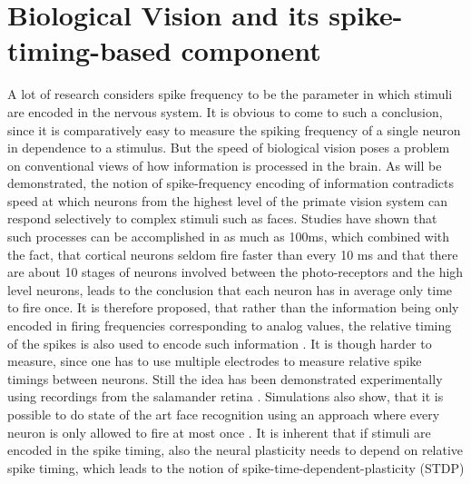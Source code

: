 \documentclass{SeminarV2}
\begin{document}
\section{Biological Vision and its spike-timing-based component} 
A lot of research considers spike frequency to be the parameter in which stimuli are encoded in the nervous system. It is obvious to come to such a conclusion, since it is comparatively easy to measure the spiking frequency of a single neuron in dependence to a stimulus.
But the speed of biological vision poses a problem on conventional views of how information is processed in the brain.
As will be demonstrated, the notion of spike-frequency encoding of information contradicts speed at which neurons from the highest level of the primate vision system can respond selectively to complex stimuli such as faces.
Studies have shown that such processes can be accomplished in as much as 100ms, which combined with the fact, that cortical neurons seldom fire faster than every 10 ms and that there are about 10 stages of neurons involved between the photo-receptors and the high level neurons, leads to the conclusion that each neuron has in average only time to fire once.
It is therefore proposed, that rather than the information being only encoded in firing frequencies corresponding to analog values,
the relative timing of the spikes is also used to encode such information \cite{thorpe_biological_1989} \cite{bialek_reading_1991} \cite{gerstner_why_1993}. It is though harder to measure, since one has to use multiple electrodes to measure relative spike timings between neurons.
Still  the idea has been demonstrated experimentally using recordings from the salamander retina \cite{gollisch_rapid_2008}.
Simulations also show, that it is possible to do state of the art face recognition using an approach 
where every neuron is only allowed to fire at most once \cite{thorpe_spike-based_2012}.
It is inherent that if stimuli are encoded in the spike timing, also the neural plasticity needs to depend on relative spike timing, which leads to the notion of spike-time-dependent-plasticity (STDP)
\end{document}
